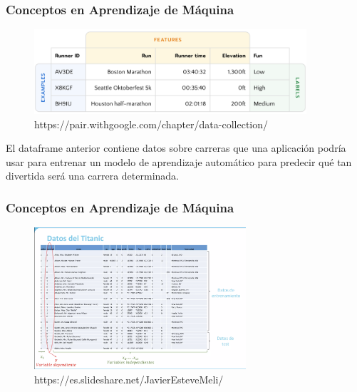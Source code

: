 \documentclass{beamer}
\begin{document}
	\begin{frame}
	\frametitle{Conceptos en Aprendizaje de Máquina}
	\begin{figure}
		\includegraphics[width=0.9\textwidth]{labels_features}
		\caption{https://pair.withgoogle.com/chapter/data-collection/}
		\centering
	\end{figure}
\begin{block}{}
El dataframe anterior contiene datos sobre carreras que una aplicación podría usar para entrenar un modelo de aprendizaje automático para predecir qué tan divertida será una carrera determinada.
	\end{block}
\end{frame}

	\begin{frame}
	\frametitle{Conceptos en Aprendizaje de Máquina}
		\begin{block}{}
	\begin{figure}
		\includegraphics[width=0.7\textwidth]{Titanic}
		\caption{https://es.slideshare.net/JavierEsteveMeli/}
		\centering
	\end{figure}
	\end{block}
\end{frame}
\end{document}
